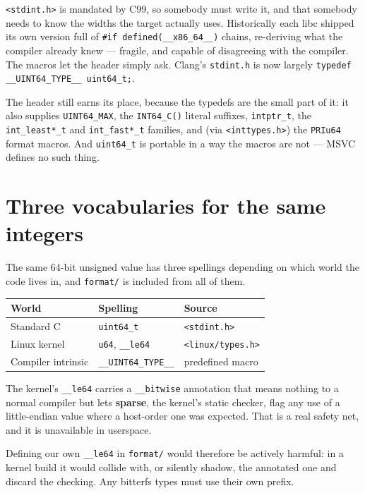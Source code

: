 \lstinline|<stdint.h>| is mandated by C99, so somebody must write it, and that
somebody needs to know the widths the target actually uses. Historically each
libc shipped its own version full of \lstinline|#if defined(__x86_64__)| chains,
re-deriving what the compiler already knew --- fragile, and capable of
disagreeing with the compiler. The macros let the header simply ask. Clang's
\lstinline|stdint.h| is now largely \lstinline|typedef __UINT64_TYPE__ uint64_t;|.

The header still earns its place, because the typedefs are the small part of it:
it also supplies \lstinline|UINT64_MAX|, the \lstinline|INT64_C()| literal
suffixes, \lstinline|intptr_t|, the \lstinline|int_least*_t| and
\lstinline|int_fast*_t| families, and (via \lstinline|<inttypes.h>|) the
\lstinline|PRIu64| format macros. And \lstinline|uint64_t| is portable in a way
the macros are not --- MSVC defines no such thing.

\section{Three vocabularies for the same integers}
\label{sec:integer-vocabularies}

The same 64-bit unsigned value has three spellings depending on which world the
code lives in, and \lstinline|format/| is included from all of them.

\begin{center}
\begin{tabular}{lll}
  \toprule
  World & Spelling & Source \\
  \midrule
  Standard C          & \lstinline|uint64_t|  & \lstinline|<stdint.h>| \\
  Linux kernel        & \lstinline|u64|, \lstinline|__le64| & \lstinline|<linux/types.h>| \\
  Compiler intrinsic  & \lstinline|__UINT64_TYPE__| & predefined macro \\
  \bottomrule
\end{tabular}
\end{center}

The kernel's \lstinline|__le64| carries a \lstinline|__bitwise| annotation that
means nothing to a normal compiler but lets \textbf{sparse}, the kernel's static
checker, flag any use of a little-endian value where a host-order one was
expected. That is a real safety net, and it is unavailable in userspace.

Defining our own \lstinline|__le64| in \lstinline|format/| would therefore be
actively harmful: in a kernel build it would collide with, or silently shadow,
the annotated one and discard the checking. Any bitterfs types must use their own
prefix.


